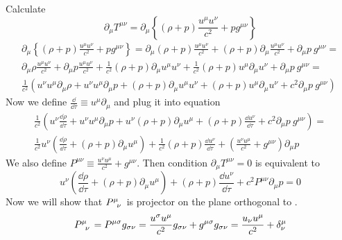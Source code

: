 \problem

Calculate
%
\begin{equation}
    \partial_\mu T^{\mu\nu} =
    \partial_\mu \left\{(\rho + p)\frac{u^\mu u^\nu}{c^2} + p g^{\mu\nu}\right\}
\end{equation}
%
\begin{multline}
    \partial_\mu \left\{(\rho + p)\frac{u^\mu u^\nu}{c^2} + p g^{\mu\nu}\right\} =
    \partial_\mu (\rho + p)\frac{u^\mu u^\nu}{c^2} +
    (\rho + p)\partial_\mu\frac{u^\mu u^\nu}{c^2} +
    \partial_\mu p~g^{\mu\nu} = \\
    \partial_\mu \rho \frac{u^\mu u^\nu}{c^2} +
    \partial_\mu p \frac{u^\mu u^\nu}{c^2} +
    \frac{1}{c^2}(\rho + p)\partial_\mu u^\mu u^\nu +
    \frac{1}{c^2}(\rho + p) u^\mu \partial_\mu u^\nu +
    \partial_\mu p~g^{\mu\nu} = \\
    \frac{1}{c^2}\left(
    u^\nu u^\mu \partial_\mu \rho  +
    u^\nu u^\mu \partial_\mu p  +
    (\rho + p)\partial_\mu u^\mu u^\nu +
    (\rho + p) u^\mu \partial_\mu u^\nu +
    c^2 \partial_\mu p~g^{\mu\nu}\right)
\end{multline}
%
Now we define $\frac{\dd}{\dd \tau} \equiv u^\mu \partial_\mu$ and
plug it into equation
%
\begin{multline}
    \frac{1}{c^2}\left(
    u^\nu \frac{\dd \rho}{\dd \tau}  +
    u^\nu u^\mu \partial_\mu p  +
    u^\nu (\rho + p)\partial_\mu u^\mu  +
    (\rho + p) \frac{\dd u^\nu}{\dd \tau} +
    c^2 \partial_\mu p~g^{\mu\nu}\right) =\\
    \frac{1}{c^2} u^\nu \left(
    \frac{\dd \rho}{\dd \tau}  +
    (\rho + p)\partial_\mu u^\mu \right)  +
    \frac{1}{c^2} (\rho + p) \frac{\dd u^\nu}{\dd \tau} +
    \left(\frac{u^\nu u^\mu}{c^2} + g^{\mu\nu}\right)  \partial_\mu p
\end{multline}
%
We also define $P^{\mu\nu} \equiv \frac{u^\nu u^\mu}{c^2} + g^{\mu\nu}$. Then
condition $\partial_\mu T^{\mu\nu} = 0$ is equivalent to
%
\begin{equation}
    u^\nu \left(
    \frac{\dd \rho}{\dd \tau}  +
    (\rho + p)\partial_\mu u^\mu \right)  +
    (\rho + p) \frac{\dd u^\nu}{\dd \tau} +
    c^2 P^{\mu\nu} \partial_\mu p =0
    \label{eq:ass7_prob1}
\end{equation}
%
Now we will show that $P\indices{^\mu_\nu}$ is projector on the plane orthogonal
to .
%
\begin{equation}
    P\indices{^\mu_\nu} = P\indices{^\mu^\sigma} g_{\sigma\nu} =
    \frac{u^\sigma u^\mu}{c^2} g_{\sigma\nu} + g^{\mu\sigma} g_{\sigma\nu} =
    \frac{u_\nu u^\mu}{c^2} + \delta^\mu_\nu
\end{equation}
